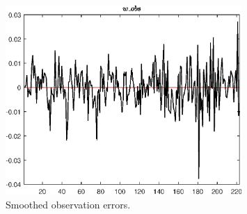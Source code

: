  
\begin{figure}[H]
\centering 
\includegraphics[width=0.80\textwidth]{BRS_sectoral_rest/graphs/BRS_sectoral_rest_SmoothedObservationErrors1}
\caption{Smoothed observation errors.}\label{Fig:SmoothedObservationErrors:1}
\end{figure}


